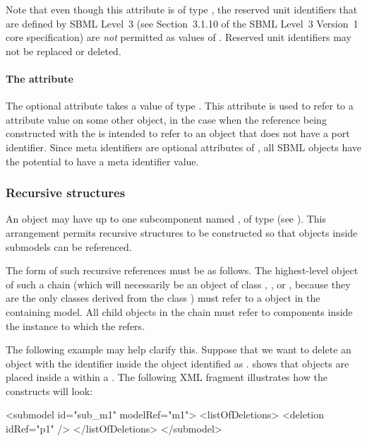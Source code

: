 Note that even though this attribute is of type ,
the reserved unit identifiers that are defined by SBML Level~3 (see
Section~3.1.10 of the SBML Level~3 Version~1 core specification) are
\emph{not} permitted as values of .  Reserved unit
identifiers may not be replaced or deleted.


\paragraph{The \fixttspace{} attribute}
\label{sbaseref-metaidref}

The optional attribute  takes a value of type 
.  This attribute is used to refer to a 
attribute value on some other object, in the case when the reference
being constructed with the \SBaseRef is intended to refer to an object
that does not have a port identifier.  Since meta identifiers are
optional attributes of \SBase, all SBML objects have the potential to
have a meta identifier value.


\subsubsection{Recursive  structures}
\label{sbaseref-recursive-sbaseref}

An \SBaseRef object may have up to one subcomponent named
, of type \SBaseRef (see ).  This
arrangement permits recursive structures to be constructed so that
objects inside submodels can be referenced.

The form of such recursive references must be as follows.  The
highest-level \SBaseRef object of such a chain (which will necessarily
be an object of class \Port, \Deletion, \ReplacedElement or \ReplacedBy,
because they are the only classes derived from the class \SBaseRef) must
refer to a \Submodel object in the containing model.  All child
\SBaseRef objects in the chain must refer to components inside the
\Model instance to which the \Submodel refers.

The following example may help clarify this.  Suppose that we want to
delete an object with the identifier  inside the \Submodel
object identified as .   shows that \Deletion
objects are placed inside a \ListOfDeletions within a \Submodel.  The 
following XML fragment illustrates how the constructs will look:

\begin{example}
<submodel id="sub_m1" modelRef="m1">
  <listOfDeletions>
    <deletion idRef="p1" />
  </listOfDeletions>
</submodel>
\end{example}

